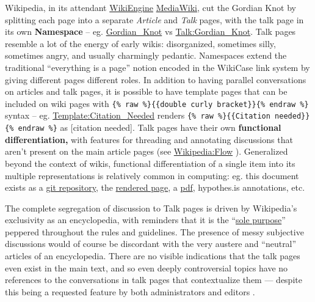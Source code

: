Wikipedia, in its attendant
\href{http://wiki.c2.com/?WikiEngines}{WikiEngine}
\href{https://meta.wikimedia.org/wiki/MediaWiki}{MediaWiki}, cut the
Gordian Knot by splitting each page into a separate \emph{Article} and
\emph{Talk} pages, with the talk page in its own \textbf{Namespace} --
eg. \href{https://en.wikipedia.org/wiki/Gordian_Knot}{Gordian\_Knot} vs
\href{https://en.wikipedia.org/wiki/Talk:Gordian_Knot}{Talk:Gordian\_Knot}.
Talk pages resemble a lot of the energy of early wikis: disorganized,
sometimes silly, sometimes angry, and usually charmingly pedantic.
Namespaces extend the traditional ``everything is a page'' notion
encoded in the WikiCase link system by giving different pages different
roles. In addition to having parallel conversations on articles and talk
pages, it is possible to have template pages that can be included on
wiki pages with
\texttt{\{\%\ raw\ \%\}\{\{double\ curly\ bracket\}\}\{\%\ endraw\ \%\}}
syntax -- eg.
\href{https://en.wikipedia.org/wiki/Template:Citation_needed}{Template:Citation\_Needed}
renders
\texttt{\{\%\ raw\ \%\}\{\{Citation\ needed\}\}\{\%\ endraw\ \%\}} as
{[}citation needed{]}. Talk pages have their own \textbf{functional
differentiation,} with features for threading and annotating discussions
that aren't present on the main article pages (see
\href{https://en.wikipedia.org/wiki/Wikipedia:Flow}{Wikipedia:Flow} \citep{WikipediaFlow2021} ). Generalized beyond the context of wikis,
functional differentiation of a single item into its multiple
representations is relatively common in computing: eg. this document
exists as a
\href{https://github.com/sneakers-the-rat/infrastructure}{git
repository}, the
\protect\hypertarget{gobackhere}{}{\href{https://jon-e.net/infrastructure/goback.html}{rendered
page}}, a
\href{https://jon-e.net/infrastructure/tex/decentralized_infrastructure_render.pdf}{pdf},
hypothes.is annotations, etc.

The complete segregation of discussion to Talk pages is driven by
Wikipedia's exclusivity as an encyclopedia, with reminders that it is
the
``\href{https://en.wikipedia.org/wiki/Wikipedia:Don't_lose_the_thread\#Move_to_the_article_talk_page}{sole
purpose}'' peppered throughout the rules and guidelines. The presence of
messy subjective discussions would of course be discordant with the very
austere and ``neutral'' articles of an encyclopedia. There are no
visible indications that the talk pages even exist in the main text, and
so even deeply controversial topics have no references to the
conversations in talk pages that contextualize them --- despite this
being a requested feature by both administrators and editors \citep{schneiderUnderstandingImprovingWikipedia2011} .

